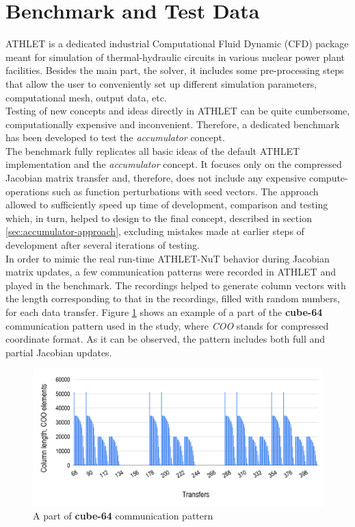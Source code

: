 \section{Benchmark and Test Data}
\label{sec:benchmark-and-test-data}


ATHLET is a dedicated industrial Computational Fluid Dynamic (CFD) package meant for simulation of thermal-hydraulic circuits in various nuclear power plant facilities. Besides the main part, the solver, it includes some pre-processing steps that allow the user to conveniently set up different simulation parameters, computational mesh, output data, etc.\\


Testing of new concepts and ideas directly in ATHLET can be quite cumbersome, computationally expensive and inconvenient. Therefore, a dedicated benchmark has been developed to test the \textit{accumulator} concept.\\


The benchmark fully replicates all basic ideas of the default ATHLET implementation and the \textit{accumulator} concept. It  focuses only on the compressed Jacobian matrix transfer and, therefore, does not include any expensive compute-operations such as function perturbations with seed vectors. The approach allowed to sufficiently speed up time of development, comparison and testing which, in turn, helped to design to the final concept, described in section \ref{sec:accumulator-approach}, excluding mistakes made at earlier steps of development after several iterations of testing.\\


In order to mimic the real run-time ATHLET-NuT behavior during Jacobian matrix updates, a few communication patterns were recorded in ATHLET and played in the benchmark. The recordings helped to generate column vectors with the length corresponding to that in the recordings, filled with random numbers, for each data transfer. Figure \ref{fig:communication-pattern} shows an example of a part of the \textbf{cube-64} communication pattern used in the study, where \textit{COO} stands for compressed coordinate format. As it can be observed, the pattern includes both full and partial Jacobian updates.\\


\begin{figure}[htpb]
  \centering
  \includegraphics[width=1.0\textwidth]{figures/chapter-3/communication-pattern.png}
  \caption{A part of \textbf{cube-64} communication pattern} \label{fig:communication-pattern}
\end{figure}


